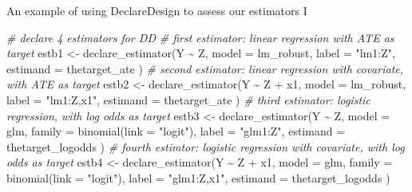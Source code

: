 \documentclass[
  ignorenonframetext,
]{beamer}
\newenvironment{Shaded}{\begin{snugshade}}{\end{snugshade}}
\newcommand{\AttributeTok}[1]{\textcolor[rgb]{0.77,0.63,0.00}{#1}}
\newcommand{\CommentTok}[1]{\textcolor[rgb]{0.56,0.35,0.01}{\textit{#1}}}
\newcommand{\FunctionTok}[1]{\textcolor[rgb]{0.00,0.00,0.00}{#1}}
\newcommand{\NormalTok}[1]{#1}
\newcommand{\OtherTok}[1]{\textcolor[rgb]{0.56,0.35,0.01}{#1}}
\newcommand{\SpecialCharTok}[1]{\textcolor[rgb]{0.00,0.00,0.00}{#1}}
\newcommand{\StringTok}[1]{\textcolor[rgb]{0.31,0.60,0.02}{#1}}
\begin{document}
\begin{frame}[fragile]{An example of using DeclareDesign to assess our
estimators I}
\protect\hypertarget{an-example-of-using-declaredesign-to-assess-our-estimators-i}{}
\scriptsize

\begin{Shaded}
\begin{Highlighting}[]
\CommentTok{\# declare 4 estimators for DD}
\CommentTok{\# first estimator: linear regression with ATE as target}
\NormalTok{estb1 }\OtherTok{\textless{}{-}} \FunctionTok{declare\_estimator}\NormalTok{(Y }\SpecialCharTok{\textasciitilde{}}\NormalTok{ Z,}
  \AttributeTok{model =}\NormalTok{ lm\_robust, }\AttributeTok{label =} \StringTok{"lm1:Z"}\NormalTok{,}
  \AttributeTok{estimand =}\NormalTok{ thetarget\_ate}
\NormalTok{)}
\CommentTok{\# second estimator: linear regression with covariate, with ATE as target}
\NormalTok{estb2 }\OtherTok{\textless{}{-}} \FunctionTok{declare\_estimator}\NormalTok{(Y }\SpecialCharTok{\textasciitilde{}}\NormalTok{ Z }\SpecialCharTok{+}\NormalTok{ x1,}
  \AttributeTok{model =}\NormalTok{ lm\_robust, }\AttributeTok{label =} \StringTok{"lm1:Z,x1"}\NormalTok{,}
  \AttributeTok{estimand =}\NormalTok{ thetarget\_ate}
\NormalTok{)}
\CommentTok{\# third estimator: logistic regression, with log odds as target}
\NormalTok{estb3 }\OtherTok{\textless{}{-}} \FunctionTok{declare\_estimator}\NormalTok{(Y }\SpecialCharTok{\textasciitilde{}}\NormalTok{ Z,}
  \AttributeTok{model =}\NormalTok{ glm, }\AttributeTok{family =} \FunctionTok{binomial}\NormalTok{(}\AttributeTok{link =} \StringTok{"logit"}\NormalTok{),}
  \AttributeTok{label =} \StringTok{"glm1:Z"}\NormalTok{, }\AttributeTok{estimand =}\NormalTok{ thetarget\_logodds}
\NormalTok{)}
\CommentTok{\# fourth estimtor: logistic regression with covariate, with log odds as target}
\NormalTok{estb4 }\OtherTok{\textless{}{-}} \FunctionTok{declare\_estimator}\NormalTok{(Y }\SpecialCharTok{\textasciitilde{}}\NormalTok{ Z }\SpecialCharTok{+}\NormalTok{ x1,}
  \AttributeTok{model =}\NormalTok{ glm, }\AttributeTok{family =} \FunctionTok{binomial}\NormalTok{(}\AttributeTok{link =} \StringTok{"logit"}\NormalTok{),}
  \AttributeTok{label =} \StringTok{"glm1:Z,x1"}\NormalTok{, }\AttributeTok{estimand =}\NormalTok{ thetarget\_logodds}
\NormalTok{)}
\end{Highlighting}
\end{Shaded}

\normalsize
\end{frame}
\end{document}
